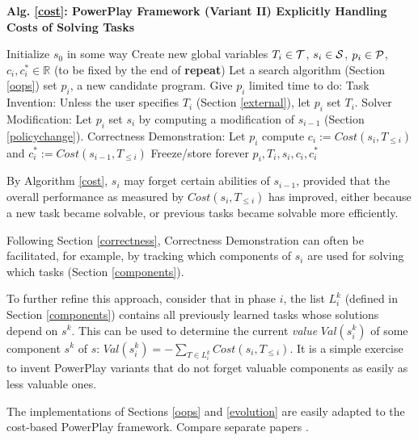 \documentclass{article}
\begin{document}
\begin{algorithm}{\bf Alg. \ref{cost}:   {\sc PowerPlay} Framework (Variant II) Explicitly Handling Costs of Solving Tasks}
\label{cost}
\begin{algorithmic}
\STATE Initialize $s_0$ in some way
\STATE Create new global variables $T_i \in \cal T$,  $s_i \in \cal S$,  $p_i  \in \cal P$, $c_i, c^*_i \in \mathbb{R}$ (to be fixed by the end of {\bf repeat})
\REPEAT 
\STATE Let a search algorithm (Section \ref{oops}) set $p_i$, a new candidate program. Give $p_i$ limited time to do:
\STATE  {\bf *} {\sc Task Invention}: Unless the user specifies  $T_i$ (Section \ref{external}), let $p_i$ set  $T_i$.
\STATE   {\bf *}  {\sc Solver Modification}: Let $p_i$ set $s_i$  by computing a modification of $s_{i-1}$ (Section \ref{policychange}).
\STATE   {\bf *}  {\sc Correctness Demonstration}: 
Let $p_i$  compute $c_i := Cost(s_i, T_{\leq i})$ and $c^*_i := Cost(s_{i-1}, T_{\leq i})$
\STATE Freeze/store forever $p_i, T_i, s_i, c_i, c^*_i$ 
\ENDFOR
\end{algorithmic}
\end{algorithm}

By Algorithm \ref{cost}, $s_i$ may forget certain abilities of $s_{i-1}$, provided that the overall performance as measured by $Cost(s_i, T_{\leq i})$
has improved, either because a new task became solvable, or previous tasks became solvable more efficiently.


Following Section \ref{correctness},  {\sc Correctness Demonstration} can often be facilitated,
for example, 
by tracking which components of $s_i$ are used for solving which tasks  (Section \ref{components}).

To further refine this approach, consider that in phase $i$, the list
$L^k_i$ (defined in Section \ref{components}) contains all previously learned tasks whose solutions depend on  $s^k$.
This  can be used to determine the current {\em value} $Val(s^k_i)$ of some component $s^k$ of $s$:
$Val(s^k_i)= - \sum_{T \in L^k_i} Cost(s_i, T_{\leq i})$. It is a simple exercise to invent {\sc PowerPlay} variants that do not
forget valuable components as easily as less valuable ones.


The  implementations of
Sections \ref{oops} and \ref{evolution} are easily adapted to the cost-based {\sc PowerPlay} framework.
Compare separate papers \cite{rupesh2012icdl,powerplay2012experiments}.
\end{document}
